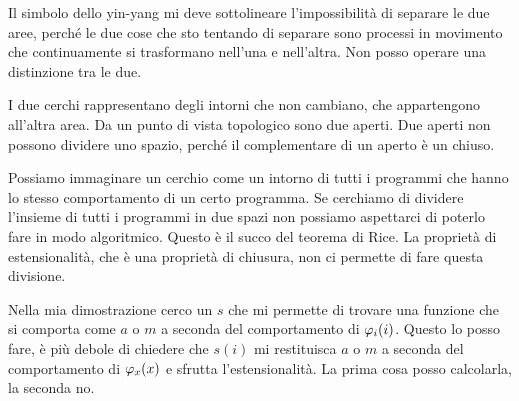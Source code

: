 \newpage

Il simbolo dello yin-yang mi deve sottolineare l'impossibilità di separare le due aree, perché le
due cose che sto tentando di separare sono processi in movimento che continuamente si trasformano
nell'una e nell'altra. Non posso operare una distinzione tra le due.

I due cerchi rappresentano degli intorni che non cambiano, che appartengono all'altra area. Da un
punto di vista topologico sono due aperti. Due aperti non possono dividere uno spazio, perché il
complementare di un aperto è un chiuso.

Possiamo immaginare un cerchio come un intorno di tutti i programmi che hanno lo stesso
comportamento di un certo programma. Se cerchiamo di dividere l'insieme di tutti i programmi in due
spazi non possiamo aspettarci di poterlo fare in modo algoritmico. Questo è il succo del teorema
di Rice. La proprietà di estensionalità, che è una proprietà di chiusura, non ci permette di
fare questa divisione.

Nella mia dimostrazione cerco un $s$ che mi permette di trovare una funzione che si comporta come
$a$ o $m$ a seconda del comportamento di $\varphi_{i}(i)$. Questo lo posso fare, è più debole di
chiedere che $s(i)$ mi restituisca $a$ o $m$ a seconda del comportamento di $\varphi_{x}(x)$ e sfrutta
l'estensionalità. La prima cosa posso calcolarla, la seconda no.

